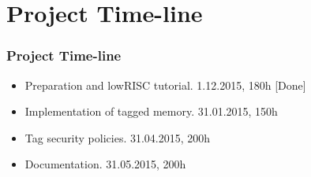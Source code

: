 \documentclass{beamer}
\begin{document}
\section{Project Time-line}

\begin{frame}
	\frametitle{Project Time-line}
   \begin{itemize}
   	  \item Preparation and lowRISC tutorial. 1.12.2015, 180h [Done]
	   \item Implementation of tagged memory. 31.01.2015, 150h
	   \item Tag security policies. 31.04.2015, 200h
		\item Documentation. 31.05.2015, 200h
   \end{itemize}
\end{frame}




\end{document}
